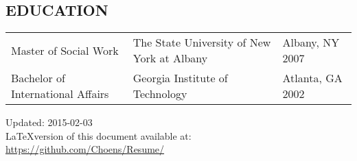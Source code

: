 \documentclass[line, margin, 10pt]{res}
\begin{document}
\begin{resume}
  \section{EDUCATION}
  \begin{tabular} {p{1.5in} p{2.125in} p{.75in}}
    Master of Social Work & The State University of New  York at Albany & Albany, NY 2007 \\
    Bachelor of International Affairs & Georgia Institute of
    Technology & Atlanta, GA 2002 
  \end{tabular}

  \vspace{.25in}
  Updated: 2015-02-03 \\
  \LaTeX version of this document available at:
  \href{https://github.com/Choens/Resume/}{https://github.com/Choens/Resume/}

  \vspace{.125in} 

\end{resume}
\end{document}
